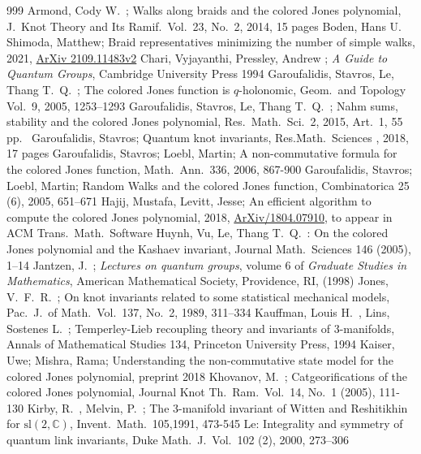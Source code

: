 \documentclass[11pt]{article}
\theoremstyle{definition}
\theoremstyle{remark}
\theoremstyle{remark}
\begin{document}
\begin{small}
\begin{thebibliography}{999}
 Armond, Cody W.\ ; Walks along braids and the colored Jones polynomial, J.\ Knot Theory and Its Ramif.\  Vol.\ 23, No.\ 2, 2014, 15 pages
 Boden, Hans U.\, Shimoda, Matthew; Braid representatives minimizing the number of simple walks, 2021, \href{https://arxiv.org/abs/2109.11483}{ArXiv 2109.11483v2}
 Chari, Vyjayanthi, Pressley, Andrew ; \textit{A Guide to Quantum Groups}, Cambridge University Press 1994
 Garoufalidis, Stavros, Le, Thang T.\ Q.\ ; The colored Jones function is $q$-holonomic, Geom.\ and Topology Vol.\ 9, 2005, 1253--1293
 Garoufalidis, Stavros, Le, Thang T.\ Q.\ ; Nahm sums, stability and the colored Jones polynomial, Res.\ Math.\ Sci.\ 2, 2015, Art.\ 1, 55 pp.\
 Garoufalidis, Stavros; Quantum knot invariants, Res.\. Math.\ Sciences , 2018, 17 pages
\bibitem{GL} Garoufalidis, Stavros; Loebl, Martin; A non-commutative formula for the colored Jones function, Math.\ Ann.\ 336, 2006, 867-900
\bibitem{GL2} Garoufalidis, Stavros; Loebl, Martin; Random Walks and the colored Jones function, Combinatorica 25 (6), 2005, 651--671
\bibitem{H} Hajij, Mustafa, Levitt, Jesse; An efficient algorithm to compute the colored Jones polynomial, 2018, \href{https://arxiv.org/abs/1804.07910}{ArXiv/1804.07910}, to appear in ACM Trans.\ Math.\ Software
\bibitem{HL} Huynh, Vu, Le, Thang T.\ Q.\ : On the colored Jones polynomial and the Kashaev invariant, Journal Math.\ Sciences 146 (2005), 1--14
\bibitem{Ja} Jantzen, J.\ ; \textit{Lectures on quantum groups}, volume 6 of \textit{Graduate Studies in Mathematics}, American Mathematical Society, Providence, RI, (1998)
\bibitem{J} Jones, V.\ F.\ R.\ ; On knot invariants related to some statistical mechanical models, Pac.\ J.\ of Math.\ Vol.\ 137, No.\ 2, 1989, 311--334
\bibitem{KL} Kauffman, Louis H.\ , Lins, Sostenes L.\ ; Temperley-Lieb recoupling theory and invariants of $3$-manifolds, Annals of Mathematical Studies 134, Princeton University Press, 1994
\bibitem{KM} Kaiser, Uwe; Mishra, Rama; Understanding the non-commutative state model for the colored Jones polynomial, preprint 2018
\bibitem{Kh} Khovanov, M.\ ; Catgeorifications of the colored Jones polynomial, Journal Knot Th.\ Ram.\ Vol.\ 14, No.\ 1 (2005), 111-130
\bibitem{KiM} Kirby, R.\ , Melvin, P.\ ; The $3$-manifold invariant of Witten and Reshitikhin for $\textrm{sl}(2,\mathbb{C})$, Invent.\ Math.\ 105,1991, 473-545
\bibitem{L} Le: Integrality and symmetry of quantum link invariants, Duke Math.\ J.\ Vol.\ 102 (2), 2000, 273--306

\end{thebibliography}
\end{small}
\end{document}
